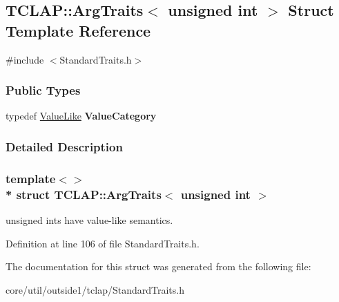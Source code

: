 \hypertarget{structTCLAP_1_1ArgTraits_3_01unsigned_01int_01_4}{}\subsection{T\+C\+L\+AP\+:\+:Arg\+Traits$<$ unsigned int $>$ Struct Template Reference}
\label{structTCLAP_1_1ArgTraits_3_01unsigned_01int_01_4}


{\ttfamily \#include $<$Standard\+Traits.\+h$>$}

\subsubsection*{Public Types}
\begin{DoxyCompactItemize}
\item 
typedef \hyperlink{structTCLAP_1_1ValueLike}{Value\+Like} {\bfseries Value\+Category}\hypertarget{structTCLAP_1_1ArgTraits_3_01unsigned_01int_01_4_ae95cdc132665581c458fc64c7e7a0490}{}\label{structTCLAP_1_1ArgTraits_3_01unsigned_01int_01_4_ae95cdc132665581c458fc64c7e7a0490}

\end{DoxyCompactItemize}


\subsubsection{Detailed Description}
\subsubsection*{template$<$$>$\\*
struct T\+C\+L\+A\+P\+::\+Arg\+Traits$<$ unsigned int $>$}

unsigned ints have value-\/like semantics. 

Definition at line 106 of file Standard\+Traits.\+h.



The documentation for this struct was generated from the following file\+:\begin{DoxyCompactItemize}
\item 
core/util/outside1/tclap/Standard\+Traits.\+h\end{DoxyCompactItemize}
